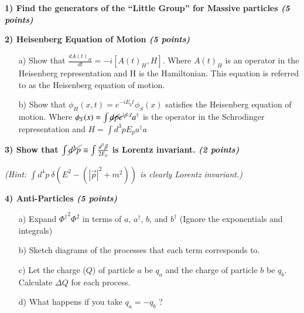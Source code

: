 {\large
\textbf{1) Find the generators of the ``Little Group'' for Massive particles \hfill \textit{(5 points)}}


\vspace*{0.25in}

\textbf{2) Heisenberg Equation of Motion \hfill \textit{(5 points)}}
\begin{itemize}
\item[a)] { Show that $\frac{dA(t)_H}{dt} = -i [A(t)_H, H]$.  Where $A(t)_H$ is an operator in the Heisenberg representation and H is the Hamiltonian. This equation is referred to as the Heisenberg equation of motion.}
\item[b)] { Show that $\phi_H(x,t) = e^{-iE_pt} \phi_S(x) $ satisfies the Heisenberg equation of motion. Where $\phi_S(x)= \int \cancel{dp} e^{i\vec{p}\cdot\vec{x}} a^\dagger $ is the operator in the Schrodinger representation and $H = \int d^3p E_p a^\dagger a$ }
\end{itemize}

\vspace*{0.25in}

\textbf{3) Show that $\int \cancel{d^3p} \equiv \int \frac{d^3\vec{p}}{2E_p}$ is Lorentz invariant. \hfill \textit{(2 points)}}

\textit{ (Hint: $\int d^4p\ \delta(E^2 - (|\vec{p}|^2 + m^2))$ is clearly Lorentz invariant.)}

\vspace*{0.25in}

\textbf{4) Anti-Particles  \hfill \textit{(5 points)}}
\begin{itemize}
\item[a)] {Expand ${\Phi^\dagger}^2 \Phi^2$  in terms of $a$, $a^\dagger$, $b$, and $b^\dagger$  (Ignore the exponentials and integrals)}
\item[b)] {Sketch diagrams of the processes that each term corresponds to.}
\item[c)] {Let the charge ($Q$) of particle $a$ be $q_a$ and the charge of particle $b$ be $q_b$.  Calculate $\Delta Q$ for each process. }
\item[d)] {What happens if you take $q_a = -q_b$ ?}
\end{itemize}





}


